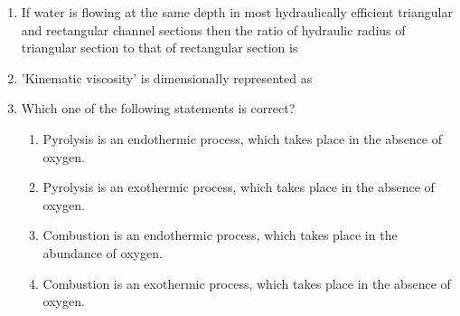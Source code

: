 \documentclass[journal,12pt,onecolumn]{article}
\theoremstyle{remark}
\begin{document}
\begin{enumerate}
\hfill{}
\begin{enumerate}
\end{enumerate}

\item If water is flowing at the same depth in most hydraulically efficient triangular and rectangular channel sections then the ratio of hydraulic radius of triangular section to that of rectangular section is

\hfill{}
\begin{enumerate}
\end{enumerate}

\item 'Kinematic viscosity' is dimensionally represented as

\hfill{}
\begin{enumerate}
\end{enumerate}

\item Which one of the following statements is correct?

\hfill{}
\begin{enumerate}
    \item Pyrolysis is an endothermic process, which takes place in the absence of oxygen.
    \item Pyrolysis is an exothermic process, which takes place in the absence of oxygen.
    \item Combustion is an endothermic process, which takes place in the abundance of oxygen.
    \item Combustion is an exothermic process, which takes place in the absence of oxygen.
\end{enumerate}


\end{enumerate}
\end{document}
